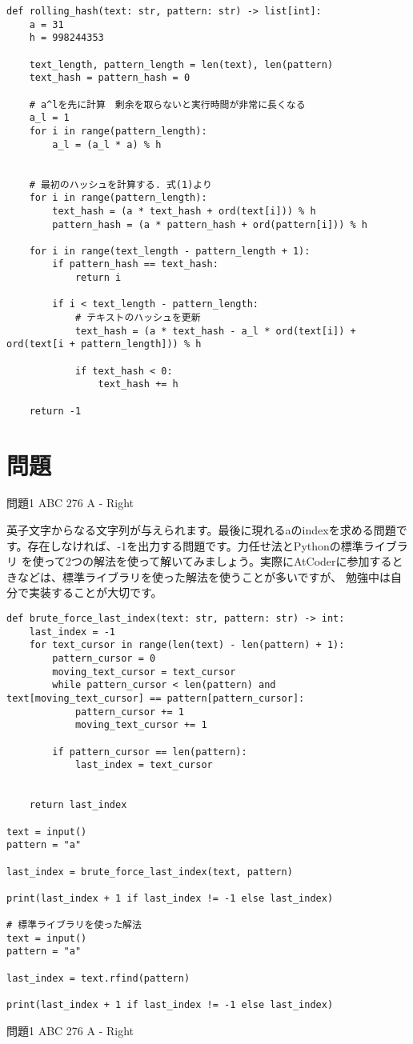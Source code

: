 \documentclass{jlreq}
\begin{document}
\begin{lstlisting}[caption=ラビン・カープ法の実装, frame=TRBL, label={Rabin-Karp}]
def rolling_hash(text: str, pattern: str) -> list[int]:
    a = 31
    h = 998244353
    
    text_length, pattern_length = len(text), len(pattern)
    text_hash = pattern_hash = 0
    
    # a^lを先に計算　剰余を取らないと実行時間が非常に長くなる
    a_l = 1
    for i in range(pattern_length):
        a_l = (a_l * a) % h
    
    
    # 最初のハッシュを計算する. 式(1)より
    for i in range(pattern_length):
        text_hash = (a * text_hash + ord(text[i])) % h
        pattern_hash = (a * pattern_hash + ord(pattern[i])) % h
    
    for i in range(text_length - pattern_length + 1):
        if pattern_hash == text_hash:
            return i
        
        if i < text_length - pattern_length:
            # テキストのハッシュを更新
            text_hash = (a * text_hash - a_l * ord(text[i]) + ord(text[i + pattern_length])) % h
        
            if text_hash < 0:
                text_hash += h
    
    return -1
\end{lstlisting}

\section{問題}

問題1 ABC 276 A - Right

英子文字からなる文字列が与えられます。最後に現れるaのindexを求める問題です。存在しなければ、-1を出力する問題です。力任せ法とPythonの標準ライブラリ
を使って2つの解法を使って解いてみましょう。実際にAtCoderに参加するときなどは、標準ライブラリを使った解法を使うことが多いですが、
勉強中は自分で実装することが大切です。

\begin{lstlisting}[caption=問題1の解答, frame=TRBL, label={problem1}]
def brute_force_last_index(text: str, pattern: str) -> int:
    last_index = -1
    for text_cursor in range(len(text) - len(pattern) + 1):
        pattern_cursor = 0
        moving_text_cursor = text_cursor
        while pattern_cursor < len(pattern) and text[moving_text_cursor] == pattern[pattern_cursor]:
            pattern_cursor += 1
            moving_text_cursor += 1
        
        if pattern_cursor == len(pattern):
            last_index = text_cursor
        
    
    return last_index

text = input()
pattern = "a"

last_index = brute_force_last_index(text, pattern)

print(last_index + 1 if last_index != -1 else last_index)

# 標準ライブラリを使った解法
text = input()
pattern = "a"

last_index = text.rfind(pattern)

print(last_index + 1 if last_index != -1 else last_index)
\end{lstlisting}

問題1 ABC 276 A - Right
\end{document}

